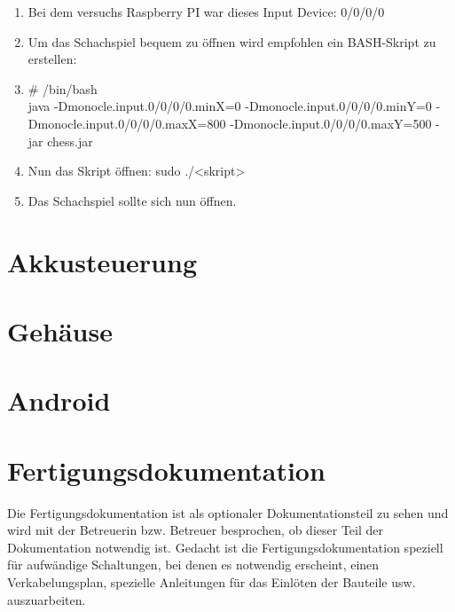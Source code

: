 \documentclass[12pt,a4paper]{article}
\newcommand{\yhbu}[0]{\color{ydkbu}}	%
\begin{document}
{\begin{enumerate}
	\item{Bei dem versuchs Raspberry PI war dieses Input Device: 0/0/0/0}
	\item{Um das Schachspiel bequem zu öffnen wird empfohlen ein BASH-Skript zu erstellen:}
	\item{\# /bin/bash \\
	java -Dmonocle.input.0/0/0/0.minX=0 -Dmonocle.input.0/0/0/0.minY=0 -Dmonocle.input.0/0/0/0.maxX=800 -Dmonocle.input.0/0/0/0.maxY=500 -jar chess.jar}
	\item{Nun das Skript öffnen: sudo ./<skript>}
	\item{Das Schachspiel sollte sich nun öffnen.}
\end{enumerate}
	


\clearpage\vfill\newpage{}
\section{Akkusteuerung}
\label{SEC:death}


\clearpage\vfill\newpage{}
\section{Gehäuse}
\label{SEC:case}


\clearpage\vfill\newpage{}
\section{Android}
\label{SEC:android}


\clearpage\vfill\newpage{}
\section{\sc Fertigungsdokumentation}
	{\yhbu
	Die Fertigungsdokumentation ist als optionaler Dokumentationsteil zu sehen und
	wird mit der Betreuerin bzw. Betreuer besprochen, ob dieser Teil der Dokumentation
	notwendig ist. Gedacht ist die Fertigungsdokumentation speziell für aufwändige
	Schaltungen, bei denen es notwendig erscheint, einen Verkabelungsplan, spezielle
	Anleitungen für das Einlöten der Bauteile usw. auszuarbeiten.
	}
}
\end{document}
